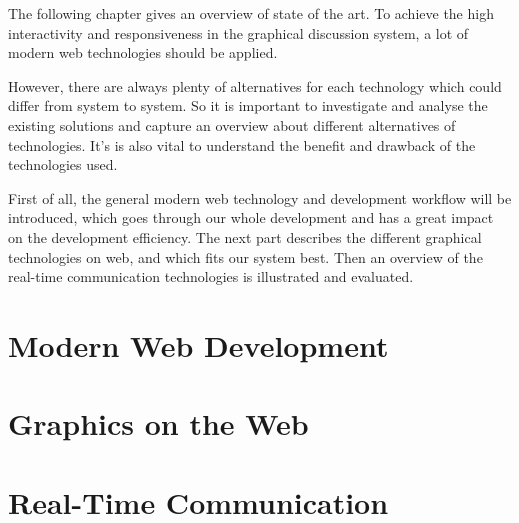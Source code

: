 The following chapter gives an overview of state of the art. To achieve the high interactivity and responsiveness in the graphical discussion system, a lot of modern web technologies should be applied.

However, there are always plenty of alternatives for each technology which could differ from system to system. So it is important to investigate and analyse the existing solutions and capture an overview about different alternatives of technologies. It's is also vital to understand the benefit and drawback of the technologies used.

First of all, the general modern web technology and development workflow will be introduced, which goes through our whole development and has a great impact on the development efficiency. The next part describes the different graphical technologies on web, and which fits our system best. Then an overview of the real-time communication technologies is illustrated and evaluated.

\section{Modern Web Development}

\section{Graphics on the Web}
 \label{graphics-section}
\section{Real-Time Communication}

% 
% 


